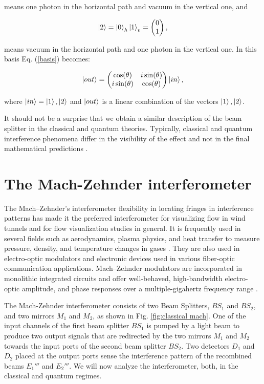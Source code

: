 \documentclass[12pt]{book}
\begin{document}
 means one photon in the horizontal path and vacuum in the vertical one, and
 
 \begin{equation}
 \ket{2}=\ket{0}_{h}\ket{1}_{v}=\begin{pmatrix} 0 \\1 \end{pmatrix},
 \end{equation}
 
means vacuum  in the horizontal path and one photon in the vertical one. In this basis Eq. (\ref{basis}) becomes:

\begin{equation}
\ket{out}=\begin{pmatrix} \cos(\theta) & i \sin(\theta) \\ i \sin(\theta) & \cos(\theta) \end{pmatrix} \ket{in},
\end{equation}

where $\ket{in}=\ket{1},\ket{2}$ and $\ket{out}$ is a linear combination of the vectors $\ket{1},\ket{2}$.

 It should not be a surprise that we obtain a similar description of the beam splitter in the classical and quantum theories. Typically, classical and quantum interference phenomena differ in the visibility of the effect and not in the final mathematical predictions \cite{leonhardt}.

\pagebreak

\chapter{The Mach-Zehnder interferometer }


 The Mach–Zehnder's interferometer flexibility in locating fringes in interference patterns has made it the preferred interferometer for visualizing flow in wind tunnels \cite{10} and for flow visualization studies in general. It is frequently used in several fields such as aerodynamics, plasma physics, and heat transfer to measure pressure, density, and temperature changes in gases \cite{11}. They are also used in electro-optic modulators \cite{ackerman} and electronic devices used in various fiber-optic communication applications. Mach–Zehnder modulators are incorporated in monolithic integrated circuits and offer well-behaved, high-bandwidth electro-optic amplitude, and phase responses over a multiple-gigahertz frequency range \cite{studenkov,capmany}.

The Mach-Zehnder interferometer consists of two Beam Splitters, $BS_{1}$ and $BS_{2}$, and two mirrors $M_{1}$ and $M_{2}$, as shown in Fig. \ref{fig:classical mach}. One of the input channels of the first beam splitter $BS_{1}$ is pumped by a light beam to produce two output signals that are redirected by the two mirrors $M_{1}$ and $M_{2}$ towards the input ports of the second beam splitter $BS_{2}$.  Two detectors $D_{1}$ and $D_{2}$ placed at the output ports sense the interference pattern of the recombined beams $E_{1}'''$ and $E_{2}'''$. We will now analyze the interferometer, both, in the classical and quantum regimes.
\end{document}
